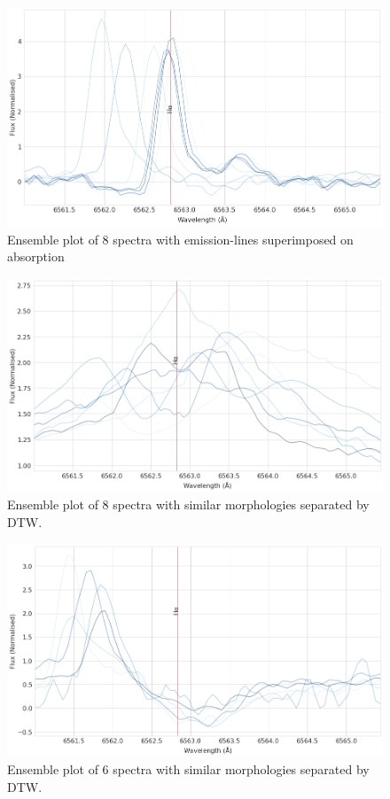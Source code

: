 \begin{figure}[!htb]
\centering
\includegraphics[scale=0.42]{figures/class_23_45.png}
\caption{Ensemble plot of 8 spectra with emission-lines superimposed on absorption}
\end{figure}

\begin{figure}[!htb]
\centering
\includegraphics[scale=0.42]{figures/class_21_45.png}
\caption{Ensemble plot of 8 spectra with similar morphologies separated by DTW.}
\end{figure}

\begin{figure}[!htb]
\centering
\includegraphics[scale=0.42]{figures/class_25_45.png}
\caption{Ensemble plot of 6 spectra with similar morphologies separated by DTW.}
\end{figure}


